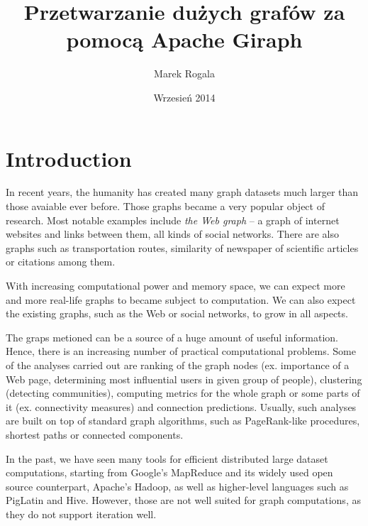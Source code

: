\documentclass{pracamgr}
\author{Marek Rogala}
\title{Przetwarzanie dużych grafów za pomocą Apache Giraph}
\date{Wrzesień 2014}
\theoremstyle{plain}
\theoremstyle{definition}
\theoremstyle{remark}
\begin{document}
\maketitle

\begin{abstract}
\begin{comment}
W~pracy przedstawiono prototypową implementację blabalizatora
  różnicowego bazującą na teorii fetorów $\sigma$-$\rho$ profesora
  Fifaka.  Wykorzystanie teorii Fifaka daje wreszcie możliwość
  efektywnego wykonania blabalizy numerycznej.  Fakt ten stanowi
  przełom technologiczny, którego konsekwencje trudno z~góry
  przewidzieć.
\end{comment}
\end{abstract}

\tableofcontents

\chapter*{Introduction}
In recent years, the humanity has created many graph datasets much larger than those avaiable ever before.
Those graphs became a very popular object of research. Most notable examples include \emph{the Web graph} -- a graph of internet websites and links between them,
all kinds of social networks. There are also graphs such as transportation routes, similarity of newspaper of scientific articles or citations among them.

With increasing computational power and memory space, we can expect more and more real-life graphs to became subject to computation. We can also expect the existing graphs, such as the Web or social networks, to grow in all aspects.

The graps metioned can be a source of a huge amount of useful information. Hence, there is an increasing number of practical computational problems.
Some of the analyses carried out are ranking of the graph nodes (ex. importance of a Web page, determining most influential users in given group of people), clustering (detecting communities), computing metrics for the whole graph or some parts of it (ex. connectivity measures) and connection predictions.
Usually, such analyses are built on top of standard graph algorithms, such as PageRank-like procedures, shortest paths or connected components.

In the past, we have seen many tools for efficient distributed large dataset computations, starting from Google's MapReduce \cite{mapreduce} and its widely used open source counterpart, Apache's Hadoop, as well as higher-level languages such as PigLatin and Hive. However, those are not well suited for graph computations, as they do not support iteration well. 
\end{document}
